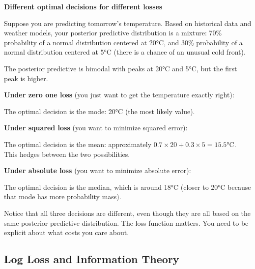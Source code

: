 \begin{examplebox}
\textbf{Different optimal decisions for different losses}

\vspace{0.5em}

Suppose you are predicting tomorrow's temperature. Based on historical data and weather models, your posterior predictive distribution is a mixture: 70\% probability of a normal distribution centered at 20°C, and 30\% probability of a normal distribution centered at 5°C (there is a chance of an unusual cold front).

\vspace{0.5em}

The posterior predictive is bimodal with peaks at 20°C and 5°C, but the first peak is higher.

\vspace{0.5em}

\textbf{Under zero one loss} (you just want to get the temperature exactly right):

The optimal decision is the mode: 20°C (the most likely value).

\vspace{0.5em}

\textbf{Under squared loss} (you want to minimize squared error):

The optimal decision is the mean: approximately $0.7 \times 20 + 0.3 \times 5 = 15.5$°C. This hedges between the two possibilities.

\vspace{0.5em}

\textbf{Under absolute loss} (you want to minimize absolute error):

The optimal decision is the median, which is around 18°C (closer to 20°C because that mode has more probability mass).

\vspace{0.5em}

Notice that all three decisions are different, even though they are all based on the same posterior predictive distribution. The loss function matters. You need to be explicit about what costs you care about.
\end{examplebox}

\vspace{1.5em}

\subsection{Log Loss and Information Theory}

